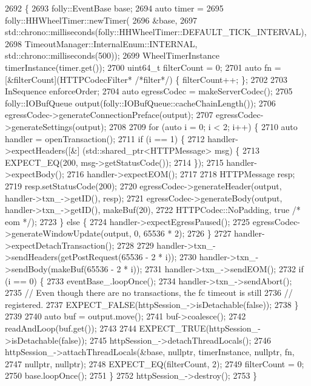 \begin{DoxyCode}
2692                                                            \{
2693   folly::EventBase base;
2694   \textcolor{keyword}{auto} timer =
2695     folly::HHWheelTimer::newTimer(
2696       &base,
2697       std::chrono::milliseconds(folly::HHWheelTimer::DEFAULT\_TICK\_INTERVAL),
2698       TimeoutManager::InternalEnum::INTERNAL, std::chrono::milliseconds(500));
2699   WheelTimerInstance timerInstance(timer.get());
2700   uint64\_t filterCount = 0;
2701   \textcolor{keyword}{auto} fn = [&filterCount](HTTPCodecFilter* \textcolor{comment}{/*filter*/}) \{ filterCount++; \};
2702 
2703   InSequence enforceOrder;
2704   \textcolor{keyword}{auto} egressCodec = makeServerCodec();
2705   folly::IOBufQueue output(folly::IOBufQueue::cacheChainLength());
2706   egressCodec->generateConnectionPreface(output);
2707   egressCodec->generateSettings(output);
2708 
2709   \textcolor{keywordflow}{for} (\textcolor{keyword}{auto} i = 0; i < 2; i++) \{
2710     \textcolor{keyword}{auto} handler = openTransaction();
2711     \textcolor{keywordflow}{if} (i == 1) \{
2712       handler->expectHeaders([&] (std::shared\_ptr<HTTPMessage> msg) \{
2713           EXPECT\_EQ(200, msg->getStatusCode());
2714         \});
2715       handler->expectBody();
2716       handler->expectEOM();
2717 
2718       HTTPMessage resp;
2719       resp.setStatusCode(200);
2720       egressCodec->generateHeader(output, handler->txn\_->getID(), resp);
2721       egressCodec->generateBody(output, handler->txn\_->getID(), makeBuf(20),
2722                                 HTTPCodec::NoPadding, \textcolor{keyword}{true} \textcolor{comment}{/* eom */});
2723     \} \textcolor{keywordflow}{else} \{
2724       handler->expectEgressPaused();
2725       egressCodec->generateWindowUpdate(output, 0, 65536 * 2);
2726     \}
2727     handler->expectDetachTransaction();
2728 
2729     handler->txn\_->sendHeaders(getPostRequest(65536 - 2 * i));
2730     handler->txn\_->sendBody(makeBuf(65536 - 2 * i));
2731     handler->txn\_->sendEOM();
2732     \textcolor{keywordflow}{if} (i == 0) \{
2733       eventBase\_.loopOnce();
2734       handler->txn\_->sendAbort();
2735       \textcolor{comment}{// Even though there are no transactions, the fc timeout is still}
2736       \textcolor{comment}{// registered.}
2737       EXPECT\_FALSE(httpSession\_->isDetachable(\textcolor{keyword}{false}));
2738     \}
2739 
2740     \textcolor{keyword}{auto} buf = output.move();
2741     buf->coalesce();
2742     readAndLoop(buf.get());
2743 
2744     EXPECT\_TRUE(httpSession\_->isDetachable(\textcolor{keyword}{false}));
2745     httpSession\_->detachThreadLocals();
2746     httpSession\_->attachThreadLocals(&base, \textcolor{keyword}{nullptr}, timerInstance, \textcolor{keyword}{nullptr}, fn,
2747                                      \textcolor{keyword}{nullptr}, \textcolor{keyword}{nullptr});
2748     EXPECT\_EQ(filterCount, 2);
2749     filterCount = 0;
2750     base.loopOnce();
2751   \}
2752   httpSession\_->destroy();
2753 \}
\end{DoxyCode}
